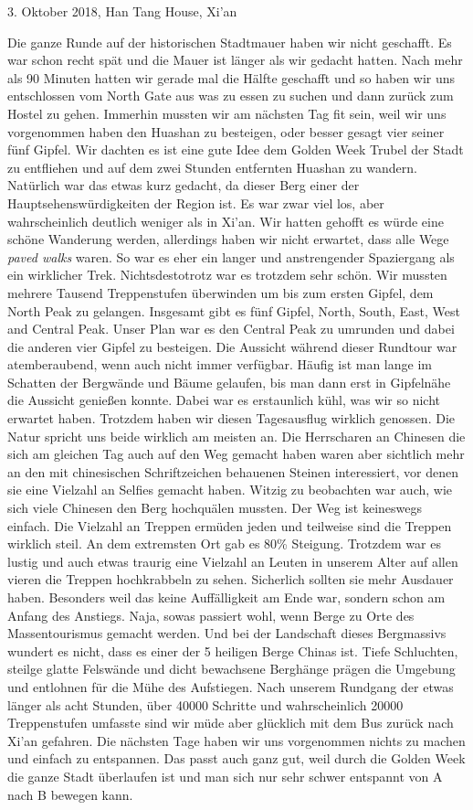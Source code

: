 \documentclass[11pt]{book}
\begin{document}
3. Oktober 2018, Han Tang House, Xi'an

Die ganze Runde auf der historischen Stadtmauer haben wir nicht geschafft. Es war schon recht spät und die Mauer 
ist länger als wir gedacht hatten. Nach mehr als 90 Minuten hatten wir gerade mal die Hälfte geschafft und so haben 
wir uns entschlossen vom North Gate aus was zu essen zu suchen und dann zurück zum Hostel zu gehen. Immerhin mussten 
wir am nächsten Tag fit sein, weil wir uns vorgenommen haben den Huashan zu besteigen, oder besser gesagt vier seiner 
fünf Gipfel.
Wir dachten es ist eine gute Idee dem Golden Week Trubel der Stadt zu entfliehen und auf dem zwei Stunden entfernten 
Huashan zu wandern. Natürlich war das etwas kurz gedacht, da dieser Berg einer der Hauptsehenswürdigkeiten der Region 
ist. Es war zwar viel los, aber wahrscheinlich deutlich weniger als in Xi'an. Wir hatten gehofft es würde eine schöne 
Wanderung werden, allerdings haben wir nicht erwartet, dass alle Wege \emph{paved walks} waren. So war es eher 
ein langer und anstrengender Spaziergang als ein wirklicher Trek. Nichtsdestotrotz war es trotzdem sehr schön. 
Wir mussten mehrere Tausend Treppenstufen überwinden um bis zum ersten Gipfel, dem North Peak zu gelangen. Insgesamt 
gibt es fünf Gipfel, North, South, East, West and Central Peak. Unser Plan war es den Central Peak zu umrunden und 
dabei die anderen vier Gipfel zu besteigen. Die Aussicht während dieser Rundtour war atemberaubend, wenn auch nicht 
immer verfügbar. Häufig ist man lange im Schatten der Bergwände und Bäume gelaufen, bis man dann erst in Gipfelnähe 
die Aussicht genießen konnte. Dabei war es erstaunlich kühl, was wir so nicht erwartet haben. Trotzdem haben 
wir diesen Tagesausflug wirklich genossen. Die Natur spricht uns beide wirklich am meisten an. Die Herrscharen an 
Chinesen die sich am gleichen Tag auch auf den Weg gemacht haben waren aber sichtlich mehr an den mit chinesischen 
Schriftzeichen behauenen Steinen interessiert, vor denen sie eine Vielzahl an Selfies gemacht haben. Witzig 
zu beobachten war auch, wie sich viele Chinesen den Berg hochquälen mussten. Der Weg ist keineswegs einfach. Die 
Vielzahl an Treppen ermüden jeden und teilweise sind die Treppen wirklich steil. An dem extremsten Ort gab es 80\% 
Steigung. Trotzdem war es lustig und auch etwas traurig eine Vielzahl an Leuten in unserem Alter auf allen vieren 
die Treppen hochkrabbeln zu sehen. Sicherlich sollten sie mehr Ausdauer haben. Besonders weil das keine Auffälligkeit 
am Ende war, sondern schon am Anfang des Anstiegs. Naja, sowas passiert wohl, wenn Berge zu Orte des Massentourismus 
gemacht werden. Und bei der Landschaft dieses Bergmassivs wundert es nicht, dass es einer der 5 heiligen Berge Chinas ist.
Tiefe Schluchten, steilge glatte Felswände und dicht bewachsene Berghänge prägen die Umgebung und entlohnen für 
die Mühe des Aufstiegen. 
Nach unserem Rundgang der etwas länger als acht Stunden, über 40000 Schritte und wahrscheinlich 20000 Treppenstufen 
umfasste sind wir müde aber glücklich mit dem Bus zurück nach Xi'an gefahren. Die nächsten Tage haben wir uns 
vorgenommen nichts zu machen und einfach zu entspannen. Das passt auch ganz gut, weil durch die Golden Week 
die ganze Stadt überlaufen ist und man sich nur sehr schwer entspannt von A nach B bewegen kann.
\end{document}
